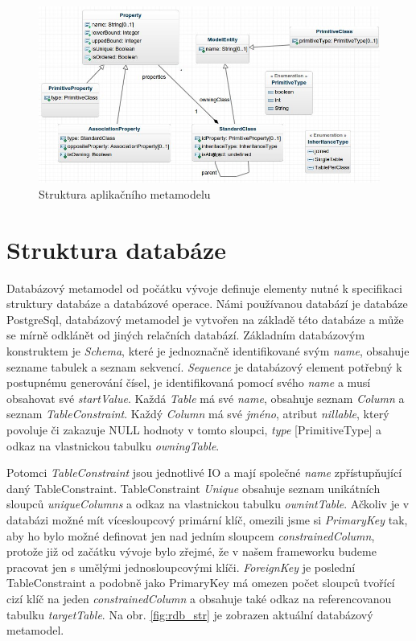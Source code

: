 \documentclass[11pt,twoside,a4paper]{book}
\begin{document}
\begin{figure}[h]
\begin{center}
\includegraphics[width=15cm]{figures/app_meta}
\caption{Struktura aplikačního metamodelu}
\label{fig:app_meta}
\end{center}
\end{figure}
\FloatBarrier

\section{Struktura databáze}
 Databázový metamodel od počátku vývoje definuje elementy nutné k specifikaci
 struktury databáze a databázové operace. Námi používanou databází je databáze
 PostgreSql, databázový metamodel je vytvořen na základě této
 databáze a může se mírně odklánět od jiných relačních databází.
 Základním databázovým konstruktem je \textit{Schema}, které je jednoznačně
 identifikované svým \textit{name}, obsahuje sezname tabulek a seznam
 sekvencí.
 \textit{Sequence} je databázový element potřebný k postupnému
 generování čísel, je identifikovaná pomocí svého \textit{name} a musí
 obsahovat své \textit{startValue}.
 Každá \textit{Table} má své \textit{name}, obsahuje seznam \textit{Column} a
 seznam \textit{TableConstraint}. Každý \textit{Column} má své \textit{jméno},
 atribut \textit{nillable}, který povoluje či zakazuje NULL hodnoty v tomto sloupci,
 \textit{type} [PrimitiveType] a odkaz na vlastnickou tabulku
 \textit{owningTable}.

Potomci \textit{TableConstraint} jsou jednotlivé IO a mají společné
\textit{name} zpřístupňující daný TableConstraint.  TableConstraint
\textit{Unique} obsahuje seznam unikátních sloupců \textit{uniqueColumns} a
odkaz na vlastnickou tabulku \textit{ownintTable}.
Ačkoliv je v databázi možné mít vícesloupcový primární klíč, omezili jsme si
\textit{PrimaryKey} tak, aby ho bylo možné definovat jen nad jedním sloupcem
\textit{constrainedColumn}, protože již od začátku vývoje bylo zřejmé, že
v našem frameworku budeme pracovat jen s umělými jednosloupcovými klíči.
\textit{ForeignKey} je poslední TableConstraint a podobně jako PrimaryKey má
omezen počet sloupců tvořící cizí klíč na jeden \textit{constrainedColumn} a
obsahuje také odkaz na referencovanou tabulku \textit{targetTable}. Na obr.
\ref{fig:rdb_str} je zobrazen aktuální databázový metamodel.
\end{document}
